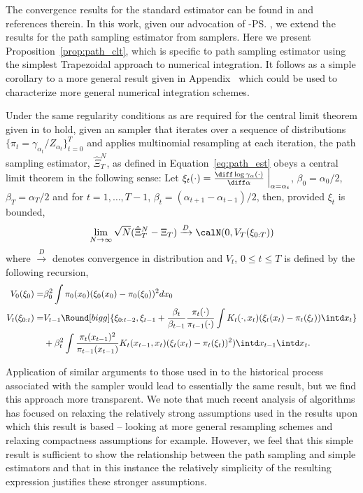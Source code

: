 The convergence results for the standard estimator can be found in
\cite{DelMoral:2006hc} and references therein. In this work, given our
advocation of \smc[2]-\ps, we extend the results for the path sampling
estimator from \smc samplers. Here we present Proposition~\ref{prop:path_clt},
which is specific to path sampling estimator using the simplest Trapezoidal
approach to numerical integration. It follows as a simple corollary to a more
general result given in Appendix~ which
could be used to characterize more general numerical integration schemes.

\begin{proposition}\label{prop:path_clt}
  Under the same regularity conditions as are required for the central limit
  theorem given in \cite{DelMoral:2006hc} to hold, given an \smc sampler that
  iterates over a sequence of distributions $\{\pi_t =
  \gamma_{\alpha_t}/Z_{\alpha_t}\}_{t=0}^T$ and applies multinomial resampling
  at each iteration, the path sampling estimator, $\hat\Xi_{T}^{N}$, as
  defined in Equation~\eqref{eq:path_est} obeys a central limit theorem in the
  following sense: Let $\xi_t(\cdot) = \frac{\diff\log
    \gamma_{\alpha}(\cdot)}{\diff\alpha}\Bigm|_{\alpha = \alpha_t}$,
  $\beta_{0} = \alpha_0 / 2$, $\beta_{T} = \alpha_T / 2$ and for $t =
  1,\ldots,T-1$, $\beta_t = (\alpha_{t + 1} - \alpha_{t-1})/2$, then,
  provided $\xi_t$ is bounded,
  \begin{equation}
    \lim_{N\to\infty}\sqrt{N}(\hat\Xi_{T}^{N} - \Xi_T)
    \xrightarrow{D}\calN(0, V_T(\xi_{0:T}))
  \end{equation}
  where $\xrightarrow{D}$ denotes convergence in distribution and $V_t$, $0\le
  t \le T$ is defined by the following recursion,
  \begin{align}
    V_0(\xi_0) =&  \beta_0^2
    \int \pi_0(x_0) (\xi_0(x_0)
    - \pi_0(\xi_0))^2 dx_0 \\
    V_t(\xi_{0:t}) =& V_{t-1}\Round[bigg]{\xi_{0:t-2}, \xi_{t-1}
    + \frac{\beta_t}{\beta_{t-1}}
    \frac{\pi_{t}(\cdot)}{\pi_{t-1}(\cdot)}
    \int K_t(\cdot,x_t) (\xi_t(x_t)-\pi_t(\xi_t)) \intd x_t
    } \\\notag
    &+ \beta_t^2 \int\frac{\pi_t(x_{t-1})^2}{\pi_{t-1}(x_{t-1})}
    K_t(x_{t-1},x_t)(\xi_t(x_t) - \pi_t(\xi_t))^2) \intd x_{t-1} \intd x_t.
  \end{align}
\end{proposition}

Application of similar arguments to those used in \cite{DelMoral:2006hc} to
the historical process associated with the \smc sampler would lead to
essentially the same result, but we find this approach more transparent. We
note that much recent analysis of \smc algorithms has focused on relaxing the
relatively strong assumptions used in the results upon which this result is
based -- looking at more general resampling schemes \cite{DelMoral:2012jq} and
relaxing compactness assumptions \cite{Whiteley:2013vx} for example. However,
we feel that this simple result is sufficient to show the relationship between
the path sampling and simple estimators and that in this instance the
relatively simplicity of the resulting expression justifies these stronger
assumptions.

